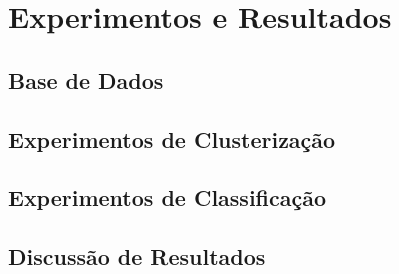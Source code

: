 \chapter{Experimentos e Resultados}
\label{cap-experimentos}

\section{Base de Dados}

\section{Experimentos de Clusterização}

\section{Experimentos de Classificação}

\section{Discussão de Resultados}